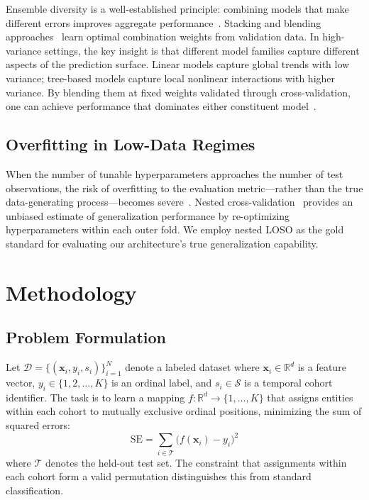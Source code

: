 \documentclass[conference]{IEEEtran}
\begin{document}
Ensemble diversity is a well-established principle: combining models that make different errors improves aggregate performance~\cite{kuncheva2003measures}. Stacking and blending approaches~\cite{wolpert1992stacked} learn optimal combination weights from validation data. In high-variance settings, the key insight is that different model families capture different aspects of the prediction surface. Linear models capture global trends with low variance; tree-based models capture local nonlinear interactions with higher variance. By blending them at fixed weights validated through cross-validation, one can achieve performance that dominates either constituent model~\cite{breiman1996bagging}.

\subsection{Overfitting in Low-Data Regimes}

When the number of tunable hyperparameters approaches the number of test observations, the risk of overfitting to the evaluation metric---rather than the true data-generating process---becomes severe~\cite{cawley2010overfitting}. Nested cross-validation~\cite{varma2006bias} provides an unbiased estimate of generalization performance by re-optimizing hyperparameters within each outer fold. We employ nested LOSO as the gold standard for evaluating our architecture's true generalization capability.

\section{Methodology}

\subsection{Problem Formulation}

Let $\mathcal{D} = \{(\mathbf{x}_i, y_i, s_i)\}_{i=1}^{N}$ denote a labeled dataset where $\mathbf{x}_i \in \mathbb{R}^d$ is a feature vector, $y_i \in \{1, 2, \ldots, K\}$ is an ordinal label, and $s_i \in \mathcal{S}$ is a temporal cohort identifier. The task is to learn a mapping $f\colon \mathbb{R}^d \rightarrow \{1, \ldots, K\}$ that assigns entities within each cohort to mutually exclusive ordinal positions, minimizing the sum of squared errors:
\begin{equation}
\text{SE} = \sum_{i \in \mathcal{T}} \bigl(f(\mathbf{x}_i) - y_i\bigr)^2
\label{eq:se}
\end{equation}
where $\mathcal{T}$ denotes the held-out test set. The constraint that assignments within each cohort form a valid permutation distinguishes this from standard classification.
\end{document}
